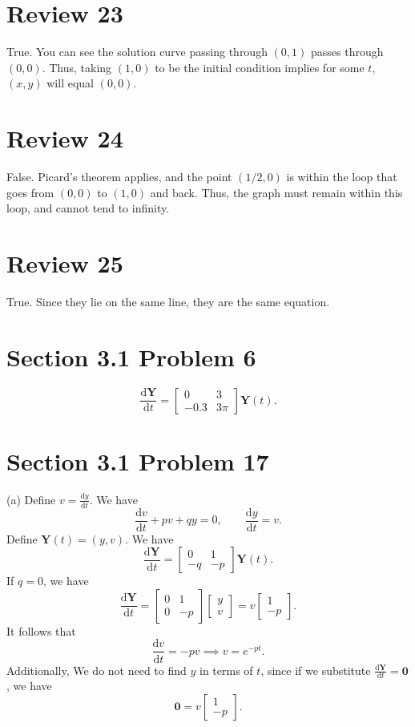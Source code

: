 \documentclass[11pt, letterpaper]{report}
\begin{document}
\section*{Review 23}
True. You can see the solution curve passing through $(0,1)$ passes through $(0,0)$. Thus, taking $(1,0)$ to be the initial condition implies for some $t$, $(x,y)$ will equal $(0,0)$.
\section*{Review 24}
False. Picard's theorem applies, and the point $(1/2,0)$ is within the loop that goes from $(0,0)$ to $(1,0)$ and back. Thus, the graph must remain within this loop, and cannot tend to infinity.
\section*{Review 25}
True. Since they lie on the same line, they are the same equation.
\section*{Section 3.1 Problem 6}
\[
	\frac{\mathrm{d}\mathbf{Y}}{\mathrm{d}t} =\begin{bmatrix} 0&3 \\ -0.3&3\pi  \end{bmatrix} \mathbf{Y}(t)
.\]

\section*{Section 3.1 Problem 17}
(a) Define $v=\frac{\mathrm{d}y}{\mathrm{d}t} $. We have
\[
	\frac{\mathrm{d}v}{\mathrm{d}t} +pv+qy=0,\qquad \frac{\mathrm{d}y}{\mathrm{d}t} =v
.\]
Define $\mathbf{Y}(t)=(y,v)$. We have
\[
	\frac{\mathrm{d}\mathbf{Y}}{\mathrm{d}t} =\begin{bmatrix} 0&1 \\ -q&-p \end{bmatrix} \mathbf{Y}(t)
.\]
If $q=0$, we have
\[
	\frac{\mathrm{d}\mathbf{Y}}{\mathrm{d}t} =\begin{bmatrix} 0&1 \\ 0&-p \end{bmatrix} \begin{bmatrix} y \\ v \end{bmatrix} =v\begin{bmatrix} 1 \\ -p \end{bmatrix} 
.\]
It follows that
\[
	\frac{\mathrm{d}v}{\mathrm{d}t} =-pv \implies v=e^{-pt}
.\]
Additionally,
We do not need to find $y$ in terms of $t$, since if we substitute $\frac{\mathrm{d}\mathbf{Y}}{\mathrm{d}t} =\mathbf{0}$, we have
\[
	\mathbf{0}=v \begin{bmatrix} 1 \\ -p \end{bmatrix} 
.\]
\end{document}

